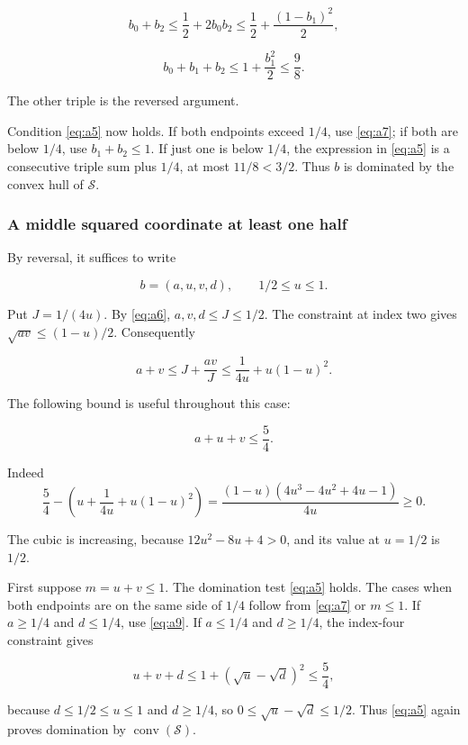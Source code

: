 \[
b_0+b_2\le\frac12+2b_0b_2
\le\frac12+\frac{(1-b_1)^2}{2},
\]

\begin{equation}\label{eq:a8}
b_0+b_1+b_2\le1+\frac{b_1^2}{2}\le\frac98.
\end{equation}

The other triple is the reversed argument.

Condition \eqref{eq:a5} now holds. If both endpoints exceed \(1/4\), use \eqref{eq:a7}; if both
are below \(1/4\), use \(b_1+b_2\le1\). If just one is below \(1/4\),
the expression in \eqref{eq:a5} is a consecutive triple sum plus \(1/4\), at most
\(11/8<3/2\). Thus \(b\) is dominated by the convex hull of \(\mathcal S\).

\subsubsection{A middle squared coordinate at least one half}

By reversal, it suffices to write

\[
b=(a,u,v,d),\qquad 1/2\le u\le1.
\]

Put \(J=1/(4u)\). By \eqref{eq:a6}, \(a,v,d\le J\le1/2\). The constraint at
index two gives \(\sqrt{av}\le(1-u)/2\). Consequently

\[
a+v\le J+\frac{av}{J}\le\frac1{4u}+u(1-u)^2.
\]

The following bound is useful throughout this case:

\begin{equation}\label{eq:a9}
a+u+v\le\frac54.
\end{equation}

Indeed
\[
\frac54-\left(u+\frac1{4u}+u(1-u)^2\right)
=\frac{(1-u)(4u^3-4u^2+4u-1)}{4u}\ge0.
\]

The cubic is increasing, because \(12u^2-8u+4>0\), and its value at
\(u=1/2\) is \(1/2\).

First suppose \(m=u+v\le1\). The domination test \eqref{eq:a5} holds. The cases when
both endpoints are on the same side of \(1/4\) follow from \eqref{eq:a7} or \(m\le1\).
If \(a\ge1/4\) and \(d\le1/4\), use \eqref{eq:a9}. If \(a\le1/4\) and
\(d\ge1/4\), the index-four constraint gives

\[
u+v+d\le1+(\sqrt u-\sqrt d)^2\le\frac54,
\]

because \(d\le1/2\le u\le1\) and \(d\ge1/4\), so
\(0\le\sqrt u-\sqrt d\le1/2\). Thus \eqref{eq:a5} again proves domination by
\(\operatorname{conv}(\mathcal S)\).

